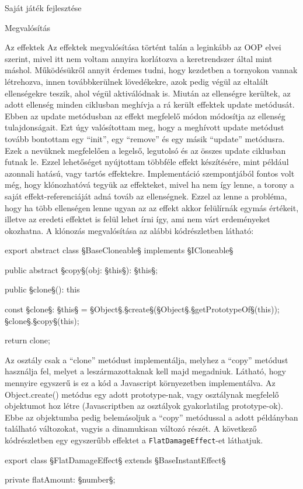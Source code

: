 \begin{MyChapter}{Saját játék fejlesztése}
\begin{MySection}{Megvalósítás}
		\begin{MySubSection}{Az effektek}
			Az effektek megvalósítása történt talán a leginkább az OOP elvei szerint, mivel itt nem voltam annyira korlátozva a keretrendszer által mint máshol. Működésükről annyit érdemes tudni, hogy kezdetben a tornyokon vannak létrehozva, innen továbbkerülnek lövedékekre, azok pedig végül az eltalált ellenségekre teszik, ahol végül aktiválódnak is. Miután az ellenségre kerültek, az adott ellenség minden ciklusban meghívja a rá került effektek update metódusát. Ebben az update metódusban az effekt megfelelő módon módosítja az ellenség tulajdonságait. Ezt úgy valósítottam meg, hogy a meghívott update metódust tovább bontottam egy ``init'', egy ``remove'' és egy másik ``update'' metódusra. Ezek a nevüknek megfelelően a legelső, legutolsó és az összes update ciklusban futnak le. Ezzel lehetőséget nyújtottam többféle effekt készítésére, mint például azonnali hatású, vagy tartós effektekre.
			Implementáció szempontjából fontos volt még, hogy klónozhatóvá tegyük az effekteket, mivel ha nem így lenne, a torony a saját effekt-referenciáját adná továb az ellenségnek. Ezzel az lenne a probléma, hogy ha több ellenségen lenne ugyan az az effekt akkor felülírnák egymás értékeit, illetve az eredeti effektet is felül lehet írni így, ami nem várt erdeményeket okozhatna. A klónozás megvalósítása az alábbi kódrészletben látható:
			\begin{javascript}
export abstract class §\color{jsType}BaseCloneable§ implements §\color{jsType}ICloneable§ {
	public abstract §\color{jsMethod}copy§(obj: §\color{jsType}this§): §\color{jsType}this§;
	
	public §\color{jsMethod}clone§(): this {
		const §\color{jsConst}clone§: §\color{jsType}this§ = §\color{jsType}Object§.§\color{jsMethod}create§(§\color{jsType}Object§.§\color{jsMethod}getPrototypeOf§(this));
		§\color{jsConst}clone§.§\color{jsMethod}copy§(this);
		
		return clone;
	}
}
			\end{javascript}
			Az osztály csak a ``clone'' metódust implementálja, melyhez a ``copy'' metódust használja fel, melyet a leszármazottaknak kell majd megadniuk. Látható, hogy mennyire egyszerű is ez a kód a Javascript környezetben implementálva. Az Object.create() metódus egy adott prototype-nak, vagy osztálynak megfelelő objektumot hoz létre (Javascriptben az osztályok gyakorlatilag prototype-ok). Ebbe az objektumba pedig belemásoljuk a ``copy'' metódussal a adott példányban található változokat, vagyis a dinamukisan változó részét.
			A következő kódrészletben egy egyszerűbb effektet a \texttt{FlatDamageEffect}-et láthatjuk. 
			\begin{javascript}
export class §\color{jsType}FlatDamageEffect§ extends §\color{jsType}BaseInstantEffect§ {
	private flatAmount: §\color{jsType}number§;
	
}
\end{javascript}
\end{MySubSection}
\end{MySection}
\end{MyChapter}
